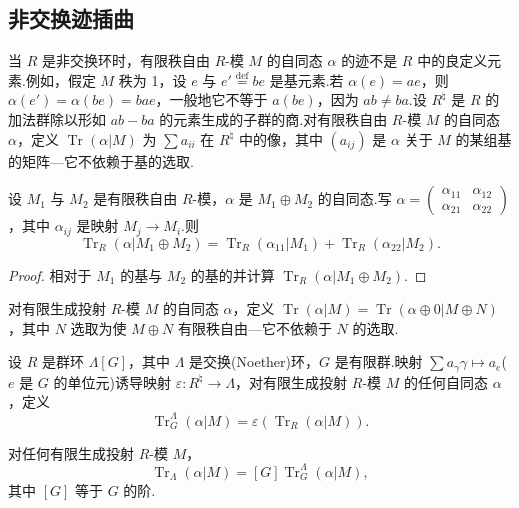 \subsection*{非交换迹插曲}

当 $R$ 是非交换环时，有限秩自由 $R$-模 $M$ 的自同态 $\alpha$ 的迹不是 $R$ 中的良定义元素.例如，假定 $M$ 秩为 1，设 $e$ 与 $e' \overset{\mathrm{def}}{=} be$ 是基元素.若 $\alpha(e) = ae$，则 $\alpha(e') = \alpha(be) = bae$，一般地它不等于 $a(be)$，因为 $ab \neq ba$.设 $R^{\natural}$ 是 $R$ 的加法群除以形如 $ab - ba$ 的元素生成的子群的商.对有限秩自由 $R$-模 $M$ 的自同态 $\alpha$，定义 $\operatorname{Tr}(\alpha|M)$ 为 $\sum a_{ii}$ 在 $R^{\natural}$ 中的像，其中 $(a_{ij})$ 是 $\alpha$ 关于 $M$ 的某组基的矩阵---它不依赖于基的选取.

\begin{lemma}\label{lem:29.22}
设 $M_1$ 与 $M_2$ 是有限秩自由 $R$-模，$\alpha$ 是 $M_1 \oplus M_2$ 的自同态.写 $\alpha = \begin{pmatrix} \alpha_{11} & \alpha_{12}\\ \alpha_{21} & \alpha_{22} \end{pmatrix}$，其中 $\alpha_{ij}$ 是映射 $M_j \to M_i$.则
\[
\operatorname{Tr}_{R}(\alpha|M_1 \oplus M_2) = \operatorname{Tr}_{R}(\alpha_{11}|M_1) + \operatorname{Tr}_{R}(\alpha_{22}|M_2).
\]
\end{lemma}

\begin{proof}
相对于 $M_1$ 的基与 $M_2$ 的基的并计算 $\operatorname{Tr}_{R}(\alpha|M_1 \oplus M_2)$.
\end{proof}

对有限生成投射 $R$-模 $M$ 的自同态 $\alpha$，定义 $\operatorname{Tr}(\alpha|M) = \operatorname{Tr}(\alpha \oplus 0|M \oplus N)$，其中 $N$ 选取为使 $M \oplus N$ 有限秩自由---它不依赖于 $N$ 的选取.

设 $R$ 是群环 $\Lambda[G]$，其中 $\Lambda$ 是交换(Noether)环，$G$ 是有限群.映射 $\sum a_{\gamma}\gamma \mapsto a_e$($e$ 是 $G$ 的单位元)诱导映射 $\varepsilon \colon R^{\natural} \to \Lambda$，对有限生成投射 $R$-模 $M$ 的任何自同态 $\alpha$，定义
\[
\operatorname{Tr}^{\Lambda}_{G}(\alpha|M) = \varepsilon(\operatorname{Tr}_{R}(\alpha|M)).
\]

\begin{lemma}\label{lem:29.23}
对任何有限生成投射 $R$-模 $M$，
\[
\operatorname{Tr}_{\Lambda}(\alpha|M) = [G] \operatorname{Tr}^{\Lambda}_{G}(\alpha|M),
\]
其中 $[G]$ 等于 $G$ 的阶.
\end{lemma}

